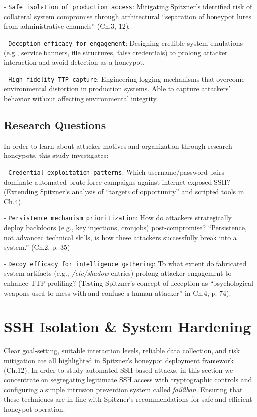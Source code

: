 \documentclass{cls/ULBreport}
\begin{document}
            - \texttt{Safe isolation of production access}: Mitigating Spitzner’s identified risk of collateral system compromise through architectural \enquote{separation of honeypot lures from administrative channels} (Ch.3, 12).

            - \texttt{Deception efficacy for engagement}: Designing credible system emulations (e.g., service banners, file structures, false credentials) to prolong attacker interaction and avoid detection as a honeypot.

            
            - \texttt{High-fidelity TTP capture}: Engineering logging mechanisms that overcome environmental distortion in production systems. Able to capture attackers' behavior without affecting environmental integrity.

        \subsection{Research Questions}
        In order to learn about attacker motives and organization through research honeypots, this study investigates:

            - \texttt{Credential exploitation patterns}: Which username/password pairs dominate automated brute-force campaigns against internet-exposed SSH? (Extending Spitzner’s analysis of \enquote{targets of opportunity} and scripted tools in Ch.4). 

            - \texttt{Persistence mechanism prioritization}: How do attackers strategically deploy backdoors (e.g., key injections, cronjobs) post-compromise? \enquote{Persistence, not advanced technical skills, is how these attackers successfully break into a system.} (Ch.2, p. 35)

            - \texttt{Decoy efficacy for intelligence gathering}: To what extent do fabricated system artifacts (e.g., \textit{/etc/shadow} entries) prolong attacker engagement to enhance TTP profiling? (Testing Spitzner’s concept of deception as \enquote{psychological weapons used to mess with and confuse a human attacker} in Ch.4, p. 74).
            


        
    \section{SSH Isolation \& System Hardening}
    Clear goal-setting, suitable interaction levels, reliable data collection, and risk mitigation are all highlighted in Spitzner's honeypot deployment framework (Ch.12). In order to study automated SSH-based attacks, in this section we concentrate on segregating legitimate SSH access with cryptographic controls and configuring a simple intrusion prevention system called \textit{fail2ban}. Ensuring that these techniques are in line with Spitzner's recommendations for safe and efficient honeypot operation.
        
\end{document}
